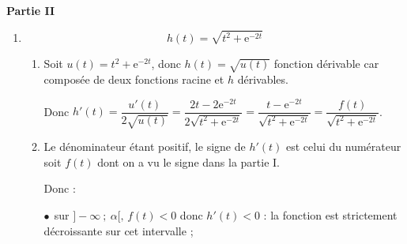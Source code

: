 \begin{center}\textbf{Partie II}\end{center}


%
%

%
%

\begin{enumerate}
\item %



\[h(t) = \sqrt{t^2 + \text{e}^{-2t}}\]

	\begin{enumerate}
		\item %
Soit $u(t) = t^2 + \text{e}^{-2t}$, donc $h(t) = \sqrt{u(t)}$ fonction dérivable car composée de deux fonctions \og racine \fg{}  et $h$ dérivables.

Donc $h'(t) = \dfrac{u'(t)}{2\sqrt{u(t)}} = \dfrac{2t - 2\text{e}^{-2t}}{2\sqrt{t^2 + \text{e}^{-2t}}} = \dfrac{t - \text{e}^{-2t}}{\sqrt{t^2 + \text{e}^{-2t}}} = \dfrac{f(t)}{\sqrt{t^2 + \text{e}^{-2t}}}$.

		\item %
		
Le dénominateur étant positif, le signe de $h'(t)$ est celui du numérateur soit $f(t)$ dont on a vu le signe dans la partie I.

Donc :

$\bullet~~$sur $]- \infty~;~\alpha[, \, f(t) < 0$ donc $h'(t) < 0$ : la fonction est strictement décroissante sur cet intervalle ;


\end{enumerate}
\end{enumerate}

